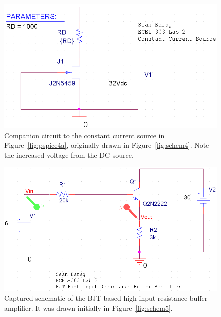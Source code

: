 \begin{figure}[H]
	\centering
	\includegraphics[width=.6\textwidth]{img/screen/constantCurrent32Shot.PNG}
	\parbox{.6\textwidth}{
	\caption{Companion circuit to the constant current source in
		Figure~\ref{fig:pspice4a}, originally drawn in Figure~\ref{fig:schem4}.
		Note the increased voltage from the DC source.}
	\label{fig:pspice4b}}
\end{figure}

\begin{figure}[H]
	\centering
	\includegraphics[width=.6\textwidth]{img/screen/bjtShot.PNG}
	\parbox{.6\textwidth}{
	\caption{Captured schematic of the BJT-based high input resistance buffer
		amplifier.  It was drawn initially in Figure~\ref{fig:schem5}.}
	\label{fig:pspice5}}
\end{figure}
